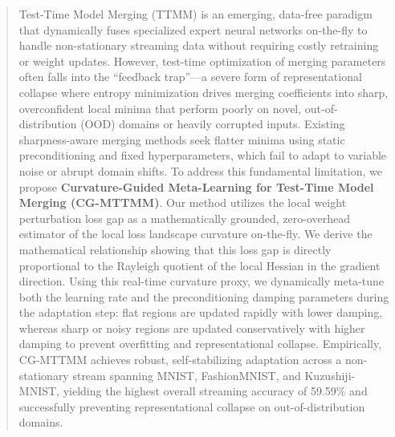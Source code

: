 \documentclass{article}
\theoremstyle{plain}
\theoremstyle{definition}
\theoremstyle{remark}
\begin{document}

\printAffiliationsAndNotice{\icmlEqualContribution}

\begin{abstract}
Test-Time Model Merging (TTMM) is an emerging, data-free paradigm that dynamically fuses specialized expert neural networks on-the-fly to handle non-stationary streaming data without requiring costly retraining or weight updates. However, test-time optimization of merging parameters often falls into the ``feedback trap''---a severe form of representational collapse where entropy minimization drives merging coefficients into sharp, overconfident local minima that perform poorly on novel, out-of-distribution (OOD) domains or heavily corrupted inputs. Existing sharpness-aware merging methods seek flatter minima using static preconditioning and fixed hyperparameters, which fail to adapt to variable noise or abrupt domain shifts. To address this fundamental limitation, we propose \textbf{Curvature-Guided Meta-Learning for Test-Time Model Merging (CG-MTTMM)}. Our method utilizes the local weight perturbation loss gap as a mathematically grounded, zero-overhead estimator of the local loss landscape curvature on-the-fly. We derive the mathematical relationship showing that this loss gap is directly proportional to the Rayleigh quotient of the local Hessian in the gradient direction. Using this real-time curvature proxy, we dynamically meta-tune both the learning rate and the preconditioning damping parameters during the adaptation step: flat regions are updated rapidly with lower damping, whereas sharp or noisy regions are updated conservatively with higher damping to prevent overfitting and representational collapse. Empirically, CG-MTTMM achieves robust, self-stabilizing adaptation across a non-stationary stream spanning MNIST, FashionMNIST, and Kuzushiji-MNIST, yielding the highest overall streaming accuracy of 59.59\% and successfully preventing representational collapse on out-of-distribution domains.
\end{abstract}
\end{document}
